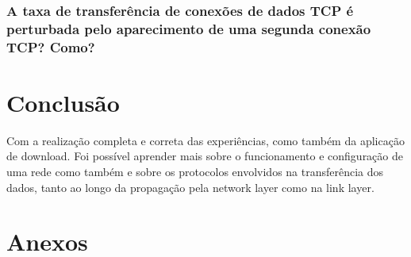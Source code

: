 \documentclass[11pt,a4paper,twocolumn]{article}
\begin{document}
\subsubsection{A taxa de transferência de conexões de dados TCP é perturbada pelo aparecimento de uma segunda conexão TCP? Como?}





\section{Conclusão}

Com a realização completa e correta das experiências, como também da aplicação de download. Foi possível aprender mais sobre o funcionamento e configuração de uma rede como também e sobre os protocolos envolvidos na transferência dos dados, tanto ao longo da propagação pela network layer como na link layer.



\section{Anexos}
\end{document}
